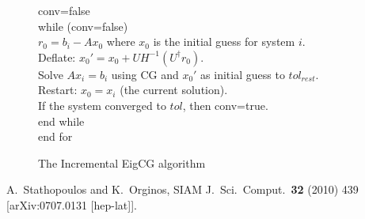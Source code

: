 \documentclass[a4paper,10pt]{article}
\begin{document}
\begin{figure}[htbp]
\begin{center}
{\begin{minipage}[t]{0.95\textwidth}
\begin{tabbing}
 \> conv=false\\
 \> \> while (conv=false) \\
 \> \> \> $r_0=b_i - A x_0$ where $x_0$ is the initial guess for system $i$.\\
 \> \> \> Deflate: $x_0' = x_0 + U H^{-1} (U^\dagger r_0).$\\
 \> \> \> Solve $A x_i = b_i$ using CG and $x_0'$ as initial guess to $tol_{rest}$.\\
 \> \> \> Restart: $x_0= x_i$ (the current solution).\\
 \> \> \> If the system converged to $tol$, then conv=true.\\
 \> \> end while\\
 \> end for\\
\end{tabbing}
\end{minipage}
}
\end{center}
\caption{The Incremental EigCG algorithm}
\label{increigcg}
\end{figure}


\begin{thebibliography}{999}
  A.~Stathopoulos and K.~Orginos,
  SIAM J.\ Sci.\ Comput.\  {\bf 32} (2010) 439
  [arXiv:0707.0131 [hep-lat]].
\end{thebibliography}
\end{document}
